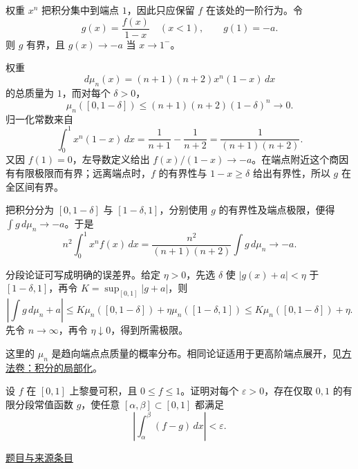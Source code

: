 \documentclass[12pt,fontset=fandol]{ctexart}
\begin{document}
\begin{solve}\label{ans:pre02-math:4}

权重 $x^n$ 把积分集中到端点 $1$，因此只应保留 $f$ 在该处的一阶行为。令
\[
g(x)=\frac{f(x)}{1-x}\quad(x<1),\qquad g(1)=-a.
\]
则 $g$ 有界，且 $g(x)\to-a$ 当 $x\to1^-$。

权重
\[
d\mu_n(x)=(n+1)(n+2)x^n(1-x)\,dx
\]
的总质量为 $1$，而对每个 $\delta>0$，
\[
\mu_n([0,1-\delta])\le(n+1)(n+2)(1-\delta)^n\longrightarrow0.
\]
归一化常数来自
\[
\int_0^1x^n(1-x)\,dx=\frac1{n+1}-\frac1{n+2}=\frac1{(n+1)(n+2)}.
\]
又因 $f(1)=0$，左导数定义给出 $f(x)/(1-x)\to-a$。在端点附近这个商因有有限极限而有界；远离端点时，$f$ 的有界性与 $1-x\ge\delta$ 给出有界性，所以 $g$ 在全区间有界。

把积分分为 $[0,1-\delta]$ 与 $[1-\delta,1]$，分别使用 $g$ 的有界性及端点极限，便得 $\int g\,d\mu_n\to-a$。于是
\[
n^2\int_0^1x^nf(x)\,dx
=\frac{n^2}{(n+1)(n+2)}\int g\,d\mu_n\longrightarrow-a.
\]

分段论证可写成明确的误差界。给定 $\eta>0$，先选 $\delta$ 使 $|g(x)+a|<\eta$ 于 $[1-\delta,1]$，再令 $K=\sup_{[0,1]}|g+a|$，则
\[
\left|\int g\,d\mu_n+a\right|
\le K\mu_n([0,1-\delta])+\eta\mu_n([1-\delta,1])
\le K\mu_n([0,1-\delta])+\eta.
\]
先令 $n\to\infty$，再令 $\eta\downarrow0$，得到所需极限。

\end{solve}

\begin{remark}[方法与条件]这里的 $\mu_n$ 是趋向端点点质量的概率分布。相同论证适用于更高阶端点展开，见\hyperref[app:integration-local]{方法卷：积分的局部化}。\end{remark}

\begin{example}[来源序号7]\label{ex:pre02-math:7}\label{pr:pre02-math:7}

设 $f$ 在 $[0,1]$ 上黎曼可积，且 $0\le f\le1$。证明对每个 $\varepsilon>0$，存在仅取 $0,1$ 的有限分段常值函数 $g$，使任意 $[\alpha,\beta]\subset[0,1]$ 都满足
\[
\left|\int_\alpha^\beta(f-g)\,dx\right|<\varepsilon.
\]

\par\href{https://github.com/lzxcr/cmc-mathematics/blob/64916fa1fdbc3e444a652eca204d5669058ee321/src/problems/preliminary/02/07.md}{题目与来源条目}

\end{example}
\end{document}
